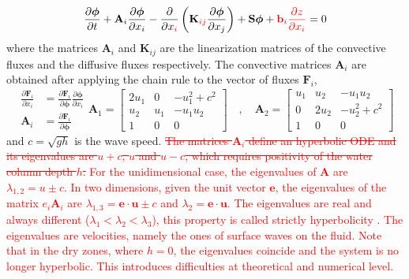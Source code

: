 \documentclass[a4paper,12pt]{elsarticle}
\newcommand{\Miguel}[1]{\textcolor{red}{#1}}
\newcommand{\pder}[2]{\frac{\partial#1}{\partial#2}}
\begin{document}
\begin{equation}
\pder{\bm{\phi}}{t} + \mathbf{A}_i\pder{\bm{\phi}}{x_i}
 - \pder{}{x_{\Miguel{i}}}\left(\mathbf{K}_{\Miguel{ij}}\pder{\bm{\phi}}{x_j}\right) + \mathbf{S}\bm{\phi} + \Miguel{ \mathbf{b}_i\pder{z}{x_i} } = 0
\end{equation}
where the matrices $\mathbf{A}_i$ and $\mathbf{K}_{ij}$ are the linearization matrices of the convective fluxes and the diffusive fluxes respectively. The convective matrices $\mathbf{A}_i$ are obtained after applying the chain rule to the vector of fluxes $\mathbf{F}_i$,
\begin{subequations}
\begin{align}
\pder{\mathbf{F}_i}{x_i} &= \pder{\mathbf{F}_i}{\bm{\phi}}\pder{\bm{\phi}}{x_i} \\
\mathbf{A}_i &= \pder{\mathbf{F}_i}{\bm{\phi}}
\end{align}
\begin{equation}
\mathbf{A}_1 = \left[\begin{matrix}
        2u_1 & 0   & -u_1^2 + c^2 \\
        u_2  & u_1 & -u_1 u_2 \\
        1    & 0   & 0
    \end{matrix} \right]
\quad , \quad
\mathbf{A}_2 = \left[\begin{matrix}
        u_1 & u_2  & -u_1 u_2 \\
        0   & 2u_2 & -u_2^2 + c^2 \\
        1   & 0    & 0
    \end{matrix} \right]
\end{equation}
\end{subequations}
and $c=\sqrt{gh}$ is the wave speed.
\Miguel{\sout{The matrices $\mathbf{A}_i$ define an hyperbolic ODE and its eigenvalues are $u+c$, $u$ and $u-c$, which requires positivity of the water column depth $h$.}}
\Miguel{
For the unidimensional case, the eigenvalues of $\mathbf{A}$ are $\lambda_{1,2}=u\pm c$.
In two dimensions, given the unit vector $\mathbf{e}$, the eigenvalues of the matrix $e_i \mathbf{A}_i$ are $\lambda_{1,3} = \mathbf{e}\cdot\mathbf{u} \pm c$ and $\lambda_2 = \mathbf{e}\cdot\mathbf{u}$.
The eigenvalues are real and always different ($\lambda_1<\lambda_2<\lambda_3$), this property is called strictly hyperbolicity \cite{raviart1996}. The eigenvalues are velocities, namely the ones of surface waves on the fluid. Note that in the dry zones, where $h=0$, the eigenvalues coincide and the system is no longer hyperbolic. This introduces difficulties at theoretical and numerical level.
}
\end{document}
